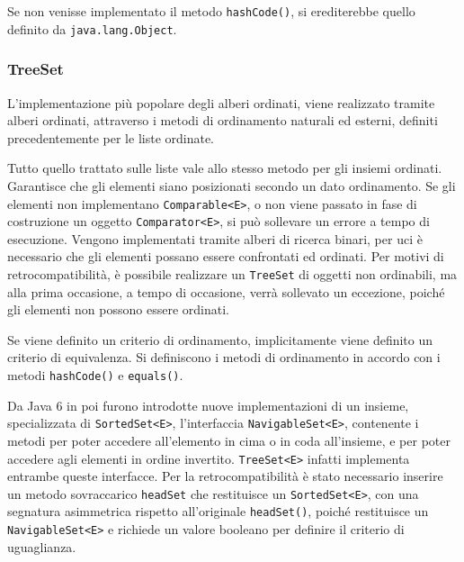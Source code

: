 \documentclass{article}
\numberwithin{equation}{subsection}
\begin{document}
Se non venisse implementato il metodo \verb|hashCode()|, si erediterebbe quello definito da \verb|java.lang.Object|. 


\subsubsection{TreeSet}

L'implementazione più popolare degli alberi ordinati, viene realizzato tramite alberi ordinati, attraverso i metodi di ordinamento naturali ed esterni, definiti precedentemente 
per le liste ordinate. 

Tutto quello trattato sulle liste vale allo stesso metodo per gli insiemi ordinati. 
Garantisce che gli elementi siano posizionati secondo un dato ordinamento. 
Se gli elementi non implementano \verb|Comparable<E>|, o non viene passato in fase di costruzione un oggetto \verb|Comparator<E>|, si può sollevare un errore a tempo di 
esecuzione. 
Vengono implementati tramite alberi di ricerca binari, per uci è necessario che gli elementi possano essere confrontati ed ordinati. Per motivi di retrocompatibilità, 
è possibile realizzare un \verb|TreeSet| di oggetti non ordinabili, ma alla prima occasione, a tempo di occasione, verrà sollevato un eccezione, poiché gli elementi non possono 
essere ordinati. 


Se viene definito un criterio di ordinamento, implicitamente viene definito un criterio di equivalenza. Si definiscono i metodi di ordinamento in accordo con i metodi 
\verb|hashCode()| e \verb|equals()|. 


Da Java 6 in poi furono introdotte nuove implementazioni di un insieme, specializzata di \verb|SortedSet<E>|, l'interfaccia \verb|NavigableSet<E>|, contenente i metodi per poter 
accedere all'elemento in cima o in coda all'insieme, e per poter accedere agli elementi in ordine invertito. 
\verb|TreeSet<E>| infatti implementa entrambe queste interfacce. Per la retrocompatibilità è stato necessario inserire un metodo sovraccarico \verb|headSet| che restituisce 
un \verb|SortedSet<E>|, con una segnatura asimmetrica rispetto all'originale \verb|headSet()|, poiché restituisce un \verb|NavigableSet<E>| e richiede un valore booleano per 
definire il criterio di uguaglianza. 
\end{document}
